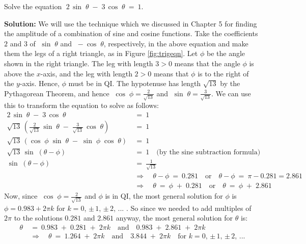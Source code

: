 \begin{exmp}\label{exmp:trigeqncombo}
\piccaption[]{\label{fig:trigeqn}}
\noindent Solve the equation $\;2\,\sin\;\theta \;-\; 3\,\cos\;\theta ~=~ 1$.\vspace{1mm}
\par\noindent\textbf{Solution:}
We will use the technique which we discussed in Chapter 5 for finding the amplitude of a combination
of sine and cosine functions. Take the coefficients $2$ and $3$ of $\;\sin\;\theta$ and
$\;-\cos\;\theta$, respectively, in the above equation and make them the legs of a right triangle,
as in Figure \ref{fig:trigeqn}. Let $\phi$ be the angle shown in the right triangle. The leg with
length $3 >0$ means that the angle $\phi$ is above the $x$-axis, and the leg with length $2>0$ means
that $\phi$ is to the right of the $y$-axis. Hence, $\phi$ must be in QI. The hypotenuse has length
$\sqrt{13}$ by the Pythagorean Theorem, and hence $\;\cos\;\phi = \frac{2}{\sqrt{13}}$ and
$\;\sin\;\theta = \frac{3}{\sqrt{13}}$. We can use this to transform the equation to solve as
follows:
\begin{align*}
 2\,\sin\;\theta \;-\; 3\,\cos\;\theta ~&=~ 1\\
 \sqrt{13}\,\left( \tfrac{2}{\sqrt{13}}\,\sin\;\theta \;-\; \tfrac{3}{\sqrt{13}}\,\cos\;\theta
  \right) ~&=~ 1\\
 \sqrt{13}\,( \cos\;\phi\;\sin\;\theta \;-\; \sin\;\phi\;\cos\;\theta ) ~&=~ 1\\
 \sqrt{13}\,\sin\;(\theta - \phi) ~&=~ 1\quad\text{(by the sine subtraction formula)}\\
 \sin\;(\theta - \phi) ~&=~ \tfrac{1}{\sqrt{13}}\\
 &\Rightarrow\quad \theta - \phi ~=~ 0.281 \quad\text{or}\quad \theta - \phi ~=~ \pi - 0.281 = 2.861\\
 &\Rightarrow\quad \theta ~=~ \phi \;+\; 0.281 \quad\text{or}\quad \theta ~=~ \phi \;+\; 2.861
\end{align*}
Now, since $\;\cos\;\phi = \frac{2}{\sqrt{13}}$ and $\phi$ is in QI, the most general solution for
$\phi$ is $\phi = 0.983 + 2\pi k$ for $k=0$, $\pm\,1$, $\pm\,2$, $...$ . So since we needed to add
multiples of $2\pi$ to the solutions $0.281$ and $2.861$ anyway, the most general solution for
$\theta$ is:
\begin{align*}
 \theta ~&=~ 0.983 \;+\; 0.281 \;+\; 2\pi k\quad\text{and}\quad 0.983 \;+\; 2.861 \;+\; 2\pi k\\
 &\Rightarrow\quad \boxed{\theta ~=~ 1.264 \;+\; 2\pi k\quad\text{and}\quad 3.844 \;+\; 2\pi k}
\quad\text{for $k=0$, $\pm\,1$, $\pm\,2$, $...$}
\end{align*}
\end{exmp}\vspace{-4mm}
